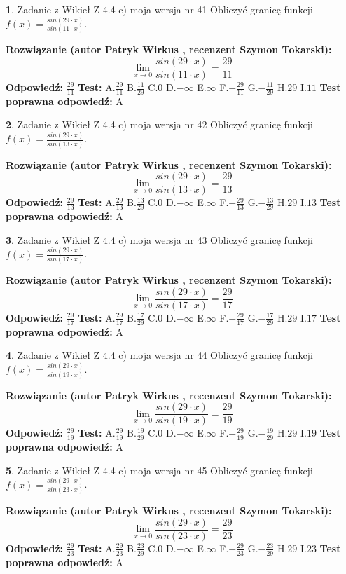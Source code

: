 \documentclass[12pt, a4paper]{article}
\theoremstyle{definition} %
\newtheorem{zad}{}
\newcommand{\zadStart}[1]{\begin{zad}#1\newline}
\newcommand{\zadStop}{\end{zad}}
\newcommand{\rozwStart}[2]{\noindent \textbf{Rozwiązanie (autor #1 , recenzent #2): }\newline}
\newcommand{\rozwStop}{\newline}
\newcommand{\odpStart}{\noindent \textbf{Odpowiedź:}\newline}
\newcommand{\odpStop}{\newline}
\newcommand{\testStart}{\noindent \textbf{Test:}\newline}
\newcommand{\testStop}{\newline}
\newcommand{\kluczStart}{\noindent \textbf{Test poprawna odpowiedź:}\newline}
\newcommand{\kluczStop}{\newline}
\begin{document}
\zadStart{Zadanie z Wikieł Z 4.4 c) moja wersja nr 41}
Obliczyć granicę funkcji $f(x)=\frac{sin(29\cdot x)}{sin(11\cdot x)}$.
\zadStop
\rozwStart{Patryk Wirkus}{Szymon Tokarski}
$$\lim\limits_{x\to 0}\frac{sin(29\cdot x)}{sin(11\cdot x)}=
\frac{29}{11}$$
\rozwStop
\odpStart
$\frac{29}{11}$
\odpStop
\testStart
A.$\frac{29}{11}$
B.$\frac{11}{29}$
C.$0$
D.$-\infty$
E.$\infty$
F.$-\frac{29}{11}$
G.$-\frac{11}{29}$
H.$29$
I.$11$
\testStop
\kluczStart
A
\kluczStop



\zadStart{Zadanie z Wikieł Z 4.4 c) moja wersja nr 42}
Obliczyć granicę funkcji $f(x)=\frac{sin(29\cdot x)}{sin(13\cdot x)}$.
\zadStop
\rozwStart{Patryk Wirkus}{Szymon Tokarski}
$$\lim\limits_{x\to 0}\frac{sin(29\cdot x)}{sin(13\cdot x)}=
\frac{29}{13}$$
\rozwStop
\odpStart
$\frac{29}{13}$
\odpStop
\testStart
A.$\frac{29}{13}$
B.$\frac{13}{29}$
C.$0$
D.$-\infty$
E.$\infty$
F.$-\frac{29}{13}$
G.$-\frac{13}{29}$
H.$29$
I.$13$
\testStop
\kluczStart
A
\kluczStop



\zadStart{Zadanie z Wikieł Z 4.4 c) moja wersja nr 43}
Obliczyć granicę funkcji $f(x)=\frac{sin(29\cdot x)}{sin(17\cdot x)}$.
\zadStop
\rozwStart{Patryk Wirkus}{Szymon Tokarski}
$$\lim\limits_{x\to 0}\frac{sin(29\cdot x)}{sin(17\cdot x)}=
\frac{29}{17}$$
\rozwStop
\odpStart
$\frac{29}{17}$
\odpStop
\testStart
A.$\frac{29}{17}$
B.$\frac{17}{29}$
C.$0$
D.$-\infty$
E.$\infty$
F.$-\frac{29}{17}$
G.$-\frac{17}{29}$
H.$29$
I.$17$
\testStop
\kluczStart
A
\kluczStop



\zadStart{Zadanie z Wikieł Z 4.4 c) moja wersja nr 44}
Obliczyć granicę funkcji $f(x)=\frac{sin(29\cdot x)}{sin(19\cdot x)}$.
\zadStop
\rozwStart{Patryk Wirkus}{Szymon Tokarski}
$$\lim\limits_{x\to 0}\frac{sin(29\cdot x)}{sin(19\cdot x)}=
\frac{29}{19}$$
\rozwStop
\odpStart
$\frac{29}{19}$
\odpStop
\testStart
A.$\frac{29}{19}$
B.$\frac{19}{29}$
C.$0$
D.$-\infty$
E.$\infty$
F.$-\frac{29}{19}$
G.$-\frac{19}{29}$
H.$29$
I.$19$
\testStop
\kluczStart
A
\kluczStop



\zadStart{Zadanie z Wikieł Z 4.4 c) moja wersja nr 45}
Obliczyć granicę funkcji $f(x)=\frac{sin(29\cdot x)}{sin(23\cdot x)}$.
\zadStop
\rozwStart{Patryk Wirkus}{Szymon Tokarski}
$$\lim\limits_{x\to 0}\frac{sin(29\cdot x)}{sin(23\cdot x)}=
\frac{29}{23}$$
\rozwStop
\odpStart
$\frac{29}{23}$
\odpStop
\testStart
A.$\frac{29}{23}$
B.$\frac{23}{29}$
C.$0$
D.$-\infty$
E.$\infty$
F.$-\frac{29}{23}$
G.$-\frac{23}{29}$
H.$29$
I.$23$
\testStop
\kluczStart
A
\kluczStop
\end{document}
